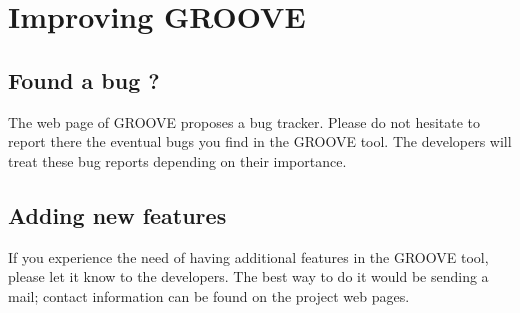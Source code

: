 \section{Improving GROOVE}

\subsection{Found a bug ?}

The web page of GROOVE proposes a bug tracker. Please do not hesitate to
report there the eventual bugs you find in the GROOVE tool. The developers
will treat these bug reports depending on their importance.

\subsection{Adding new features}

If you experience the need of having additional features in the GROOVE
tool, please let it know to the developers. The best way to do it would be
sending a mail; contact information can be found on the project web pages.
